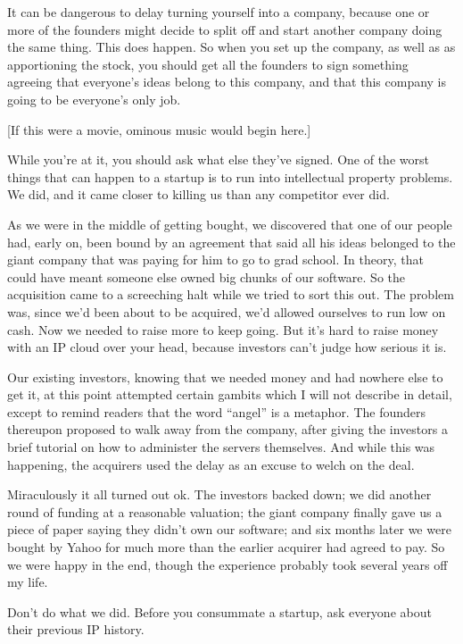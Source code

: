 \documentclass[12pt]{book}
\begin{document}
It can be dangerous to delay turning yourself into a company, because
one or more of the founders might decide to split off and start another
company doing the same thing. This does happen. So when you set up the
company, as well as as apportioning the stock, you should get all the
founders to sign something agreeing that everyone's ideas belong to this
company, and that this company is going to be everyone's only job.

{[}If this were a movie, ominous music would begin here.{]}

While you're at it, you should ask what else they've signed. One of the
worst things that can happen to a startup is to run into intellectual
property problems. We did, and it came closer to killing us than any
competitor ever did.

As we were in the middle of getting bought, we discovered that one of
our people had, early on, been bound by an agreement that said all his
ideas belonged to the giant company that was paying for him to go to
grad school. In theory, that could have meant someone else owned big
chunks of our software. So the acquisition came to a screeching halt
while we tried to sort this out. The problem was, since we'd been about
to be acquired, we'd allowed ourselves to run low on cash. Now we needed
to raise more to keep going. But it's hard to raise money with an IP
cloud over your head, because investors can't judge how serious it is.

Our existing investors, knowing that we needed money and had nowhere
else to get it, at this point attempted certain gambits which I will not
describe in detail, except to remind readers that the word ``angel'' is
a metaphor. The founders thereupon proposed to walk away from the
company, after giving the investors a brief tutorial on how to
administer the servers themselves. And while this was happening, the
acquirers used the delay as an excuse to welch on the deal.

Miraculously it all turned out ok. The investors backed down; we did
another round of funding at a reasonable valuation; the giant company
finally gave us a piece of paper saying they didn't own our software;
and six months later we were bought by Yahoo for much more than the
earlier acquirer had agreed to pay. So we were happy in the end, though
the experience probably took several years off my life.

Don't do what we did. Before you consummate a startup, ask everyone
about their previous IP history.
\end{document}
